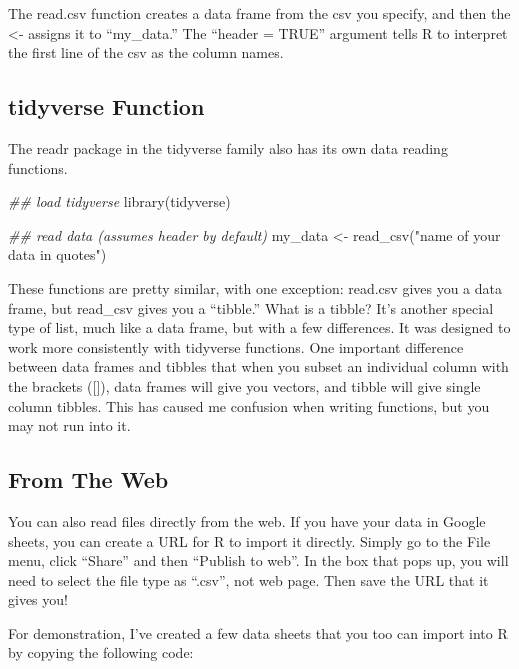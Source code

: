 \documentclass[
  letterpaper,
  DIV=11,
  numbers=noendperiod]{scrreprt}
\newenvironment{Shaded}{\begin{snugshade}}{\end{snugshade}}
\newcommand{\DocumentationTok}[1]{\textcolor[rgb]{0.37,0.37,0.37}{\textit{#1}}}
\newcommand{\FunctionTok}[1]{\textcolor[rgb]{0.28,0.35,0.67}{#1}}
\newcommand{\NormalTok}[1]{\textcolor[rgb]{0.00,0.23,0.31}{#1}}
\newcommand{\OtherTok}[1]{\textcolor[rgb]{0.00,0.23,0.31}{#1}}
\newcommand{\StringTok}[1]{\textcolor[rgb]{0.13,0.47,0.30}{#1}}
\begin{document}
The read.csv function creates a data frame from the csv you specify, and
then the \textless- assigns it to ``my\_data.'' The ``header = TRUE''
argument tells R to interpret the first line of the csv as the column
names.

\subsection{tidyverse Function}\label{tidyverse-function}

The readr package in the tidyverse family also has its own data reading
functions.

\begin{Shaded}
\begin{Highlighting}[]
\DocumentationTok{\#\# load tidyverse}
\FunctionTok{library}\NormalTok{(tidyverse)}

\DocumentationTok{\#\# read data (assumes header by default)}
\NormalTok{my\_data }\OtherTok{\textless{}{-}} \FunctionTok{read\_csv}\NormalTok{(}\StringTok{"name of your data in quotes"}\NormalTok{)}
\end{Highlighting}
\end{Shaded}

These functions are pretty similar, with one exception: read.csv gives
you a data frame, but read\_csv gives you a ``tibble.'' What is a
tibble? It's another special type of list, much like a data frame, but
with a few differences. It was designed to work more consistently with
tidyverse functions. One important difference between data frames and
tibbles that when you subset an individual column with the brackets
({[}{]}), data frames will give you vectors, and tibble will give single
column tibbles. This has caused me confusion when writing functions, but
you may not run into it.

\subsection{From The Web}\label{from-the-web}

You can also read files directly from the web. If you have your data in
Google sheets, you can create a URL for R to import it directly. Simply
go to the File menu, click ``Share'' and then ``Publish to web''. In the
box that pops up, you will need to select the file type as ``.csv'', not
web page. Then save the URL that it gives you!

For demonstration, I've created a few data sheets that you too can
import into R by copying the following code:
\end{document}
